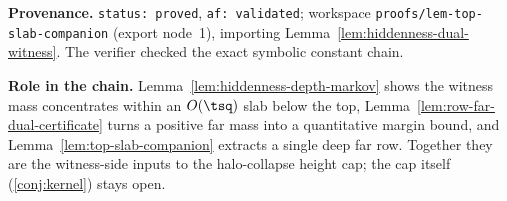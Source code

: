 \noindent\textbf{Provenance.} \texttt{status: proved}, \texttt{af: validated}; workspace
\texttt{proofs/lem-top-slab-companion} (export node~1), importing
Lemma~\ref{lem:hiddenness-dual-witness}. The verifier checked the exact symbolic constant chain.

\noindent\textbf{Role in the chain.} Lemma~\ref{lem:hiddenness-depth-markov} shows the witness mass
concentrates within an $O(\tsq)$ slab below the top, Lemma~\ref{lem:row-far-dual-certificate} turns a
positive far mass into a quantitative margin bound, and Lemma~\ref{lem:top-slab-companion} extracts a
single deep far row. Together they are the witness-side inputs to the halo-collapse height cap; the cap
itself (\ref{conj:kernel}) stays open.
